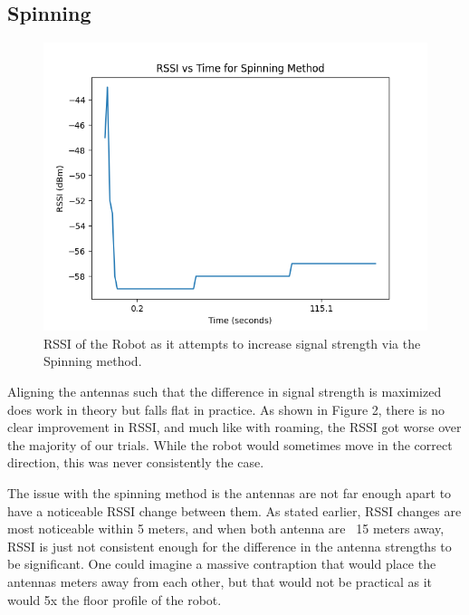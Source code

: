 \subsection{Spinning}
\begin{figure}[tp]
\centering
\includegraphics[scale=0.5]{figures/rssi_microwave}
\caption{RSSI of the Robot as it attempts to increase signal strength via the Spinning method.}
\end{figure}
Aligning the antennas such that the difference in signal strength is maximized does work in theory but falls flat in practice. As shown in Figure 2, there is no clear improvement in RSSI, and much like with roaming, the RSSI got worse over the majority of our trials. While the robot would sometimes move in the correct direction, this was never consistently the case. 

The issue with the spinning method is the antennas are not far enough apart to have a noticeable RSSI change between them. As stated earlier, RSSI changes are most noticeable within 5 meters, and when both antenna are ~15 meters away, RSSI is just not consistent enough for the difference in the antenna strengths to be significant. One could imagine a massive contraption that would place the antennas meters away from each other, but that would not be practical as it would 5x the floor profile of the robot. 

